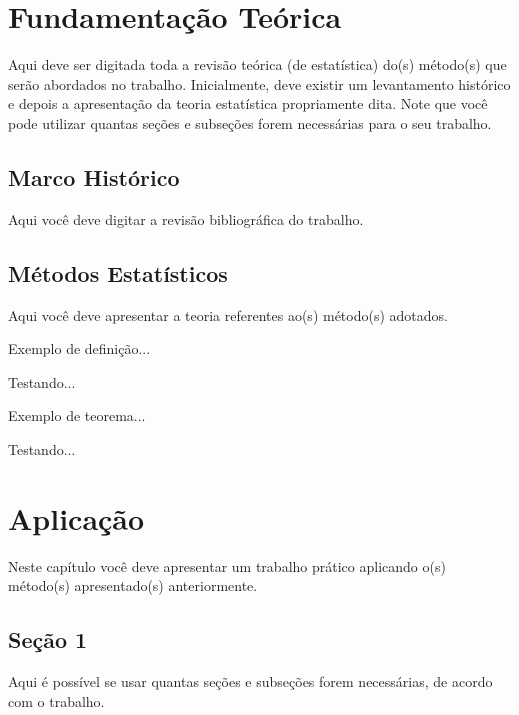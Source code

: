 \documentclass[12pt,oneside,a4paper,chapter=TITLE,
			   english,brazil]{abntex2}
\begin{document}
\chapter{Fundamentação Teórica}

Aqui deve ser digitada toda a revisão teórica (de estatística) do(s) método(s) que serão abordados no trabalho. Inicialmente, deve existir um levantamento histórico e depois a apresentação da teoria estatística propriamente dita. Note que você pode utilizar quantas seções e subseções forem necessárias para o seu trabalho.


\section{Marco Histórico}

Aqui você deve digitar a revisão bibliográfica do trabalho.


\section{Métodos Estatísticos}

Aqui você deve apresentar a teoria referentes ao(s) método(s) adotados.

Exemplo de definição...
\begin{definicao}
	Testando...
\end{definicao}

Exemplo de teorema...
\begin{teorema}
	Testando...
\end{teorema}


\chapter{Aplicação}

Neste capítulo você deve apresentar um trabalho prático aplicando o(s) método(s) apresentado(s) anteriormente.

\section{Seção 1}
Aqui é possível se usar quantas seções e subseções forem necessárias, de acordo com o trabalho.
\end{document}

